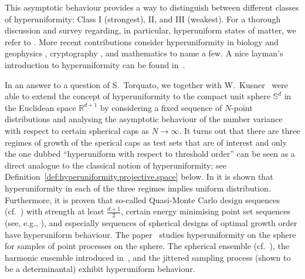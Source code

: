 This asymptotic behaviour provides a way to distinguish between different classes of hyperuniformity: Class I (strongest), II, and III (weakest). 
%
For a thorough discussion and survey regarding, in particular, hyperuniform states of matter, we refer to \cite{Torquato2018:hyperuniform_states_matter}. 
%
More recent contributions consider hyperuniformity in biology and geophysics \cite{Ge2023:hidden_order_turing_patterns,hu_Liu_Wa+2023:disordered,zhu2023dispersed}, cryptography \cite{gilpin2018:cryptographic}, and mathematics \cite{bjorklund_hartnick2023:hyperuniformity} to name a few.
%
%
A nice layman's introduction to hyperuniformity can be found in~\cite{Wolchover2016:birds_eye_view_natures_hidden_order}.
%


In an answer to a question of S.~Torquato, we together with W.~Kusner~\cite{Brauchart_Grabner_Kusner2019:hyperuniform_deterministic} were able to extend the concept of hyperuniformity to the compact unit sphere $\mathbb{S}^d$ in the Euclidean space $\mathbb{R}^{d+1}$ by considering a fixed sequence of $N$-point distributions and analysing the asymptotic behaviour of the number variance with respect to certain spherical caps as $N \to \infty$. It turns out that there are three regimes of growth of the sperical caps as test sets that are of interest and only the one dubbed ``hyperuniform with respect to threshold order'' can be seen as a direct analogue to the classical notion of hyperuniformity; see  Definition~\ref{def:hyperuniformity.projective.space} below. 
% 
In \cite{Brauchart_Grabner_Kusner2019:hyperuniform_deterministic} it is shown that hyperuniformity in each of the three regimes implies uniform distribution. Furthermore, it is proven that so-called Quasi-Monte Carlo design sequences (cf.~\cite{Brauchart_Saff_Sloan+2014:qmc-designs}) with strength at least $\frac{d+1}{2}$, certain energy minimising point set sequences (see, e.g., \cite{Brauchart_Grabner2015:distributing_sphere,Borodachov_Hardin_Saff2019:discreta_energy_on_rectifiable_sets}), and especially sequences of spherical designs of optimal growth order have hyperuniform behaviour. The paper~\cite{Brauchart_Grabner_Kusner+2020:hyperuniform_point_sets} studies hyperuniformity on the sphere for samples of point processes on the sphere. The spherical ensemble (cf.~\cite{Hough_Krishnapur_Peres+2009:zeros_gaussian}), the harmonic ensemble introduced in~\cite{Beltran_Marzo_Ortega-Cerda2016:determinantal}, and the jittered sampling process (shown to be a determinantal) exhibit hyperuniform behaviour. 

